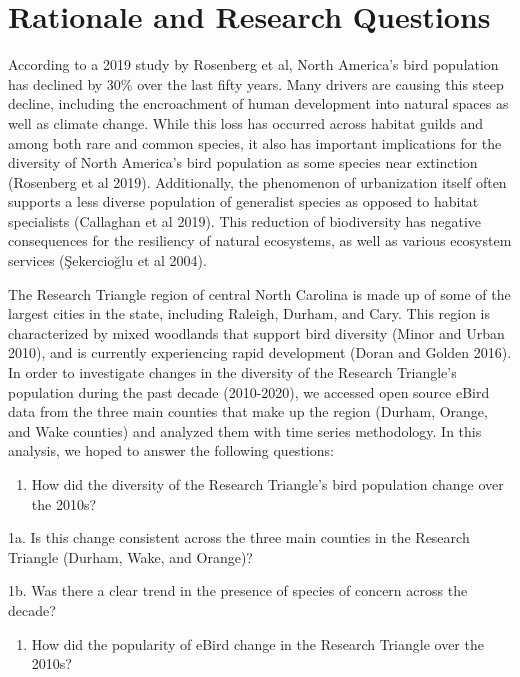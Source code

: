 \documentclass[
  12pt,
]{article}
\providecommand{\tightlist}{%
  \setlength{\itemsep}{0pt}\setlength{\parskip}{0pt}}
\begin{document}
\hypertarget{rationale-and-research-questions}{%
\section{Rationale and Research
Questions}\label{rationale-and-research-questions}}

According to a 2019 study by Rosenberg et al, North America's bird
population has declined by 30\% over the last fifty years. Many drivers
are causing this steep decline, including the encroachment of human
development into natural spaces as well as climate change. While this
loss has occurred across habitat guilds and among both rare and common
species, it also has important implications for the diversity of North
America's bird population as some species near extinction (Rosenberg et
al 2019). Additionally, the phenomenon of urbanization itself often
supports a less diverse population of generalist species as opposed to
habitat specialists (Callaghan et al 2019). This reduction of
biodiversity has negative consequences for the resiliency of natural
ecosystems, as well as various ecosystem services (Şekercioğlu et al
2004).

The Research Triangle region of central North Carolina is made up of
some of the largest cities in the state, including Raleigh, Durham, and
Cary. This region is characterized by mixed woodlands that support bird
diversity (Minor and Urban 2010), and is currently experiencing rapid
development (Doran and Golden 2016). In order to investigate changes in
the diversity of the Research Triangle's population during the past
decade (2010-2020), we accessed open source eBird data from the three
main counties that make up the region (Durham, Orange, and Wake
counties) and analyzed them with time series methodology. In this
analysis, we hoped to answer the following questions:

\begin{enumerate}
\def\labelenumi{\arabic{enumi}.}
\tightlist
\item
  How did the diversity of the Research Triangle's bird population
  change over the 2010s?
\end{enumerate}

1a. Is this change consistent across the three main counties in the
Research Triangle (Durham, Wake, and Orange)?

1b. Was there a clear trend in the presence of species of concern across
the decade?

\begin{enumerate}
\def\labelenumi{\arabic{enumi}.}
\setcounter{enumi}{1}
\tightlist
\item
  How did the popularity of eBird change in the Research Triangle over
  the 2010s?
\end{enumerate}
\end{document}
